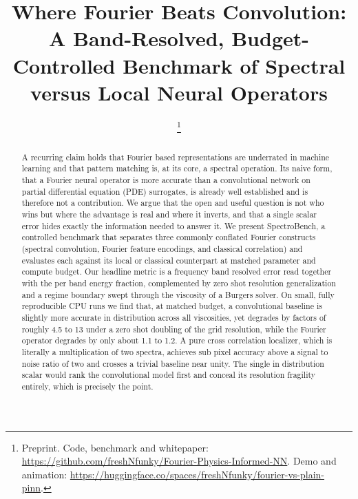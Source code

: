 \documentclass[conference]{IEEEtran}
\begin{document}
\title{Where Fourier Beats Convolution: A Band-Resolved, Budget-Controlled Benchmark of Spectral versus Local Neural Operators}

\author{
\thanks{Preprint. Code, benchmark and whitepaper: \url{https://github.com/freshNfunky/Fourier-Physics-Informed-NN}. Demo and animation: \url{https://huggingface.co/spaces/freshNfunky/fourier-vs-plain-pinn}.}}

\maketitle

\begin{abstract}
A recurring claim holds that Fourier based representations are underrated in machine learning and that pattern matching is, at its core, a spectral operation. Its naive form, that a Fourier neural operator is more accurate than a convolutional network on partial differential equation (PDE) surrogates, is already well established and is therefore not a contribution. We argue that the open and useful question is not who wins but where the advantage is real and where it inverts, and that a single scalar error hides exactly the information needed to answer it. We present SpectroBench, a controlled benchmark that separates three commonly conflated Fourier constructs (spectral convolution, Fourier feature encodings, and classical correlation) and evaluates each against its local or classical counterpart at matched parameter and compute budget. Our headline metric is a frequency band resolved error read together with the per band energy fraction, complemented by zero shot resolution generalization and a regime boundary swept through the viscosity of a Burgers solver. On small, fully reproducible CPU runs we find that, at matched budget, a convolutional baseline is slightly more accurate in distribution across all viscosities, yet degrades by factors of roughly 4.5 to 13 under a zero shot doubling of the grid resolution, while the Fourier operator degrades by only about 1.1 to 1.2. A pure cross correlation localizer, which is literally a multiplication of two spectra, achieves sub pixel accuracy above a signal to noise ratio of two and crosses a trivial baseline near unity. The single in distribution scalar would rank the convolutional model first and conceal its resolution fragility entirely, which is precisely the point.
\end{abstract}
\end{document}

